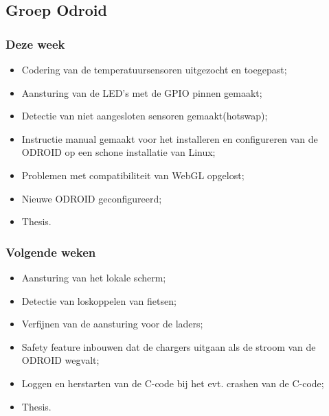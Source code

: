\subsection*{Groep Odroid}
\subsubsection*{Deze week}

\begin{itemize}
\item Codering van de temperatuursensoren uitgezocht en toegepast;
\item Aansturing van de LED's met de GPIO pinnen gemaakt;
\item Detectie van niet aangesloten sensoren gemaakt(hotswap);
\item Instructie manual gemaakt voor het installeren en configureren van de ODROID op een schone installatie van Linux;
\item Problemen met compatibiliteit van WebGL opgelost;
\item Nieuwe ODROID geconfigureerd;
\item Thesis.
\end{itemize}

\subsubsection*{Volgende weken}
\begin{itemize}
\item Aansturing van het lokale scherm;
\item Detectie van loskoppelen van fietsen;
\item Verfijnen van de aansturing voor de laders;
\item Safety feature inbouwen dat de chargers uitgaan als de stroom van de ODROID wegvalt;
\item Loggen en herstarten van de C-code bij het evt. crashen van de C-code;
\item Thesis.
\end{itemize}